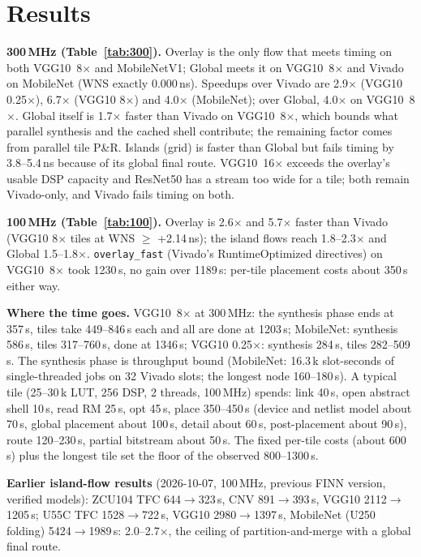 \documentclass[10pt,twocolumn]{article}
\newcommand{\code}[1]{\texttt{\small #1}}
\begin{document}
\section{Results}
\textbf{300\,MHz (Table~\ref{tab:300}).} Overlay is the only flow that meets timing on both
VGG10~8$\times$ and MobileNetV1; Global meets it on VGG10~8$\times$ and Vivado on MobileNet
(WNS exactly 0.000\,ns). Speedups over Vivado are 2.9$\times$ (VGG10 0.25$\times$), 6.7$\times$
(VGG10 8$\times$) and 4.0$\times$ (MobileNet); over Global, 4.0$\times$ on VGG10~8$\times$.
Global itself is 1.7$\times$ faster than Vivado on VGG10~8$\times$, which bounds what parallel
synthesis and the cached shell contribute; the remaining factor comes from parallel tile P\&R.
Islands (grid) is faster than Global but fails timing by 3.8--5.4\,ns because of its global final
route. VGG10~16$\times$ exceeds the overlay's usable DSP capacity and ResNet50 has a stream too wide
for a tile; both remain Vivado-only, and Vivado fails timing on both.

\textbf{100\,MHz (Table~\ref{tab:100}).} Overlay is 2.6$\times$ and 5.7$\times$ faster than
Vivado (VGG10 8$\times$ tiles at WNS $\ge$ +2.14\,ns); the island flows reach 1.8--2.3$\times$ and
Global 1.5--1.8$\times$. \code{overlay\_fast} (Vivado's RuntimeOptimized directives) on
VGG10~8$\times$ took 1230\,s, no gain over 1189\,s: per-tile placement costs about 350\,s
either way.

\textbf{Where the time goes.} VGG10~8$\times$ at 300\,MHz: the synthesis phase ends at 357\,s,
tiles take 449--846\,s each and all are done at 1203\,s; MobileNet: synthesis 586\,s, tiles
317--760\,s, done at 1346\,s; VGG10 0.25$\times$: synthesis 284\,s, tiles 282--509\,s. The
synthesis phase is throughput bound (MobileNet: 16.3\,k slot-seconds of single-threaded jobs on
32 Vivado slots; the longest node 160--180\,s). A typical tile (25--30\,k LUT, 256 DSP, 2
threads, 100\,MHz) spends: link 40\,s, open abstract shell 10\,s, read RM 25\,s, opt 45\,s,
place 350--450\,s (device and netlist model about 70\,s, global placement about 100\,s, detail
about 60\,s, post-placement about 90\,s), route 120--230\,s, partial bitstream about 50\,s.
The fixed per-tile costs (about 600\,s) plus the longest tile set the floor of the observed
800--1300\,s.

\textbf{Earlier island-flow results} (2026-10-07, 100\,MHz, previous FINN version, verified
models): ZCU104 TFC 644$\to$323\,s, CNV 891$\to$393\,s, VGG10 2112$\to$1205\,s; U55C TFC
1528$\to$722\,s, VGG10 2980$\to$1397\,s, MobileNet (U250 folding) 5424$\to$1989\,s: 2.0--2.7$\times$,
the ceiling of partition-and-merge with a global final route.
\end{document}
